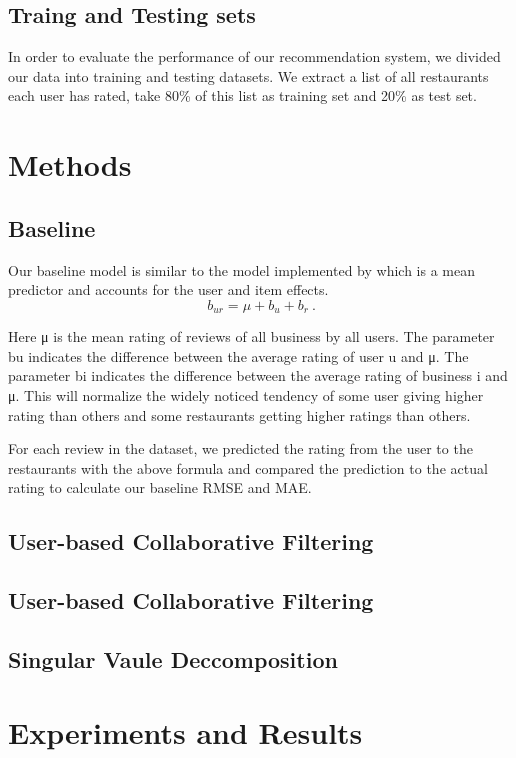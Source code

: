 \documentclass{llncs}
\begin{document}
\subsection{Traing and Testing sets}
%
In order to evaluate the performance of our recommendation system, we divided our data into training and testing datasets. We extract a list of all restaurants each user has rated, take 80\% of this list as training set and 20\% as test set. 

\section{Methods}
\subsection{Baseline}
Our baseline model is similar to the model implemented by\cite{Yehuda} which is a mean predictor and accounts for the user and item effects. 
\begin{equation}
\ b_{ur} = \mu + b_u + b_r \ .
\end{equation}

Here μ is the mean rating of reviews of all business by all users. The parameter bu indicates the difference between the average rating of user u and μ. The parameter bi indicates the difference between the average rating of business i and μ. This will normalize the widely noticed tendency of some user giving higher rating than others and some restaurants getting higher ratings than others.

For each review in the dataset, we predicted the rating from the user to the restaurants with the above formula and compared the prediction to the actual rating to calculate our baseline RMSE and MAE. 

\subsection{User-based Collaborative Filtering}

\subsection{User-based Collaborative Filtering}

\subsection{Singular Vaule Deccomposition}

\section{Experiments and Results}
%
\end{document}
